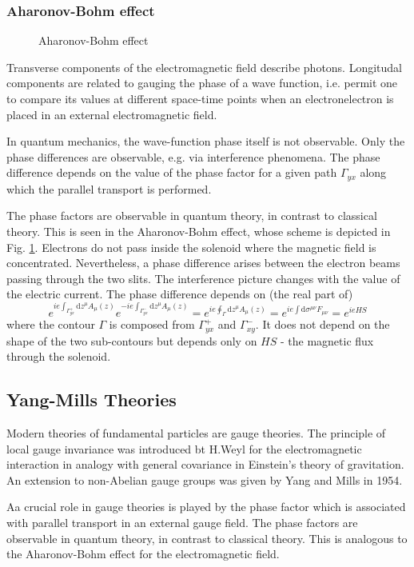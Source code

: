\subsubsection{Aharonov-Bohm effect}
\begin{figure}
  \label{fig:aharonov}
  \centering
  \caption{Aharonov-Bohm effect}
\end{figure}
Transverse components of the  electromagnetic field describe photons.
Longitudal components are related to gauging the phase of a wave function, i.e.
permit one to compare its values at different space-time points when an
electronelectron is placed in an external electromagnetic field.
\par In quantum mechanics, the wave-function phase itself is not observable.
Only the phase differences are observable, e.g. via interference phenomena. The
phase difference depends on the value of the phase factor for a  given path
$\Gamma_{yx}$ along which the parallel transport is performed.
\par The phase factors are observable in quantum theory, in contrast to
classical theory. This is seen in the Aharonov-Bohm effect, whose scheme is
depicted in Fig. \ref{fig:aharonov}. Electrons do not pass inside the solenoid
where the magnetic field is concentrated. Nevertheless, a phase difference
arises between the electron beams passing through the two slits. The
interference picture changes with the value of the electric current.
The phase difference depends on (the real part of)
\begin{equation}
e^{ie\int_{\Gamma^+_{yx}}\mathrm{d}z^\mu A_\mu(z)}
e^{-ie\int_{\Gamma^-_{yx}}\mathrm{d}z^\mu A_\mu(z)}
  = e^{ie\oint_\Gamma\mathrm{d}z^\mu A_\mu(z)}
  = e^{ie\int\mathrm{d}\sigma^{\mu\nu}F_{\mu\nu}} = e^{ieHS}
\end{equation}
where the contour $\Gamma$ is composed from $\Gamma^+_{yx}$ and
$\Gamma^-_{xy}$. It does not depend on the shape of the two sub-contours but
depends only on $HS$ - the magnetic flux through the solenoid.
\subsection{Yang-Mills Theories}
Modern theories of fundamental particles are gauge theories. The principle of
local gauge invariance was introduced bt H.Weyl for the electromagnetic
interaction in analogy with general covariance in Einstein's theory of
gravitation. An extension to non-Abelian gauge groups was given by Yang and
Mills in 1954.
\par Aa crucial role in gauge theories is played by the phase factor which is
associated with parallel transport in an external gauge field. The phase
factors are observable in quantum theory, in contrast to classical theory. This
is analogous to the  Aharonov-Bohm effect for the electromagnetic field.

